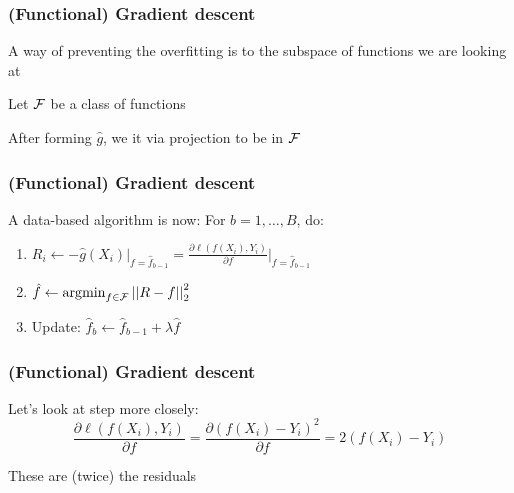 \documentclass[12pt]{beamer}
\begin{document}
\begin{frame}[fragile]
\frametitle{(Functional) Gradient descent}
A way of preventing the overfitting is to  the subspace of functions we are looking at

\vsp
Let $\mathcal{F}$ be a class of functions

\vsp
After forming $\hat{g}$, we  it via projection to be in $\mathcal{F}$

\end{frame}

\begin{frame}[fragile]
\frametitle{(Functional) Gradient descent}
A data-based algorithm is now:
For $b = 1, \ldots, B$, do: 
\begin{enumerate}
\item $R_i \leftarrow - \hat{g}(X_i)\bigg|_{f = \hat{f}_{b-1}} = \frac{\partial \ell(f(X_i),Y_i)}{\partial f}\bigg|_{f = \hat{f}_{b-1}}$
\item $\hat{f}  \leftarrow \operatorname*{\arg\!\min}_{f\in\mathcal{F}} \left|\left| R - f \right|\right|_2^2$

\item Update: $\hat{f}_b \leftarrow \hat{f}_{b-1} + \lambda \hat{f}$
\end{enumerate}

\end{frame}

\begin{frame}[fragile]
\frametitle{(Functional) Gradient descent}
Let's look at step  more closely:
\[
\frac{\partial \ell(f(X_i),Y_i)}{\partial f}
 =
 \frac{\partial (f(X_i) - Y_i)^2}{\partial f}
  =
 2(f(X_i) - Y_i)
\]

 These are (twice) the residuals

\end{frame}
\end{document}
